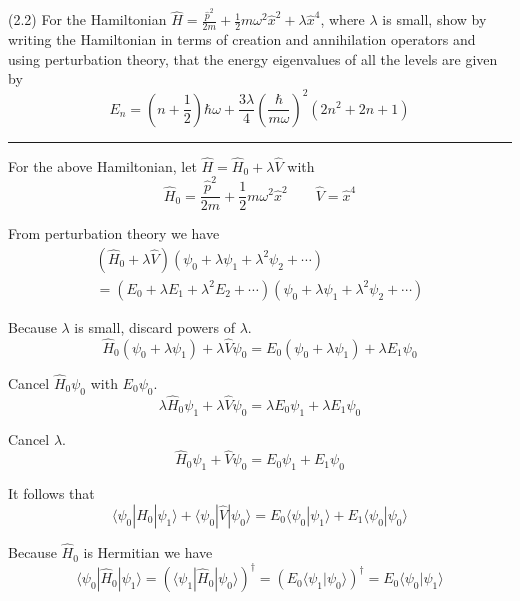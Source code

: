 \documentclass[12pt]{article}
\begin{document}
(2.2)
For the Hamiltonian
$\hat H=\frac{\hat p^2}{2m}+\frac{1}{2}m\omega^2\hat x^2+\lambda\hat x^4$,
where $\lambda$ is small, show by writing the Hamiltonian
in terms of creation and annihilation operators and
using perturbation theory, that the energy eigenvalues
of all the levels are given by
\begin{equation*}
E_n=\left(n+\frac{1}{2}\right)\hbar\omega
+\frac{3\lambda}{4}\left(\frac{\hbar}{m\omega}\right)^2
\left(2n^2+2n+1\right)
\tag{2.67}
\end{equation*}

\bigskip
\hrule

\bigskip
For the above Hamiltonian, let $\hat H=\hat H_0+\lambda\hat V$ with
\begin{equation*}
\hat H_0=\frac{\hat p^2}{2m}+\frac{1}{2}m\omega^2\hat x^2
\qquad
\hat V=\hat x^4
\end{equation*}

From perturbation theory we have
\begin{multline*}
\left(\hat H_0+\lambda\hat V\right)\left(\psi_0+\lambda\psi_1+\lambda^2\psi_2+\cdots\right)
\\
=\left(E_0+\lambda E_1+\lambda^2 E_2+\cdots\right)\left(\psi_0+\lambda\psi_1+\lambda^2\psi_2+\cdots\right)
\end{multline*}

Because $\lambda$ is small, discard powers of $\lambda$.
\begin{equation*}
\hat H_0(\psi_0+\lambda\psi_1)+\lambda \hat V\psi_0=E_0(\psi_0+\lambda\psi_1)+\lambda E_1\psi_0
\end{equation*}

Cancel $\hat H_0\psi_0$ with $E_0\psi_0$.
\begin{equation*}
\lambda\hat H_0\psi_1+\lambda \hat V\psi_0=\lambda E_0\psi_1+\lambda E_1\psi_0
\end{equation*}

Cancel $\lambda$.
\begin{equation*}
\hat H_0\psi_1+\hat V\psi_0=E_0\psi_1+E_1\psi_0
\end{equation*}

It follows that
\begin{equation*}
\langle\psi_0|\hat H_0|\psi_1\rangle
+\langle\psi_0|\hat V|\psi_0\rangle
=E_0\langle\psi_0|\psi_1\rangle
+E_1\langle\psi_0|\psi_0\rangle
\tag{1}
\end{equation*}

Because $\hat H_0$ is Hermitian we have
\begin{equation*}
\langle\psi_0|\hat H_0|\psi_1\rangle
=\left(\langle\psi_1|\hat H_0|\psi_0\rangle\right)^\dag
=\left(E_0\langle\psi_1|\psi_0\rangle\right)^\dag
=E_0\langle\psi_0|\psi_1\rangle
\end{equation*}
\end{document}
